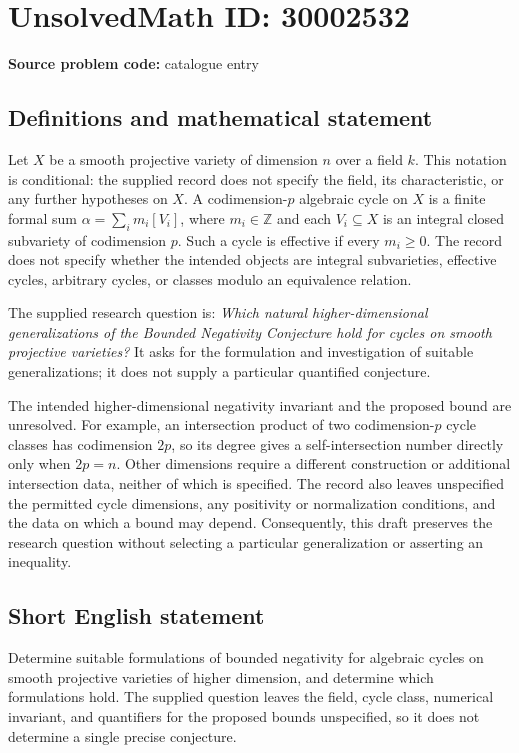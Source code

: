 \documentclass[11pt]{article}
\newcommand{\Z}{\mathbb{Z}}
\begin{document}
\section*{UnsolvedMath ID: 30002532}
\textbf{Source problem code:} catalogue entry
\subsection{Definitions and mathematical statement}
Let \(X\) be a smooth projective variety of dimension \(n\) over a field \(k\). This notation is conditional: the supplied record does not specify the field, its characteristic, or any further hypotheses on \(X\). A codimension-\(p\) algebraic cycle on \(X\) is a finite formal sum \(\alpha=\sum_i m_i[V_i]\), where \(m_i\in\Z\) and each \(V_i\subseteq X\) is an integral closed subvariety of codimension \(p\). Such a cycle is effective if every \(m_i\geq 0\). The record does not specify whether the intended objects are integral subvarieties, effective cycles, arbitrary cycles, or classes modulo an equivalence relation.

The supplied research question is: \emph{Which natural higher-dimensional generalizations of the Bounded Negativity Conjecture hold for cycles on smooth projective varieties?} It asks for the formulation and investigation of suitable generalizations; it does not supply a particular quantified conjecture.

The intended higher-dimensional negativity invariant and the proposed bound are unresolved. For example, an intersection product of two codimension-\(p\) cycle classes has codimension \(2p\), so its degree gives a self-intersection number directly only when \(2p=n\). Other dimensions require a different construction or additional intersection data, neither of which is specified. The record also leaves unspecified the permitted cycle dimensions, any positivity or normalization conditions, and the data on which a bound may depend. Consequently, this draft preserves the research question without selecting a particular generalization or asserting an inequality.
\subsection{Short English statement}
Determine suitable formulations of bounded negativity for algebraic cycles on smooth projective varieties of higher dimension, and determine which formulations hold. The supplied question leaves the field, cycle class, numerical invariant, and quantifiers for the proposed bounds unspecified, so it does not determine a single precise conjecture.
\end{document}
